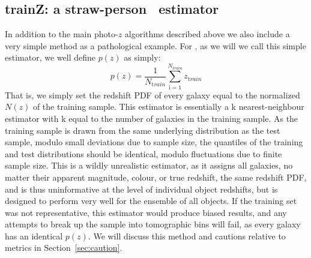 \subsection{trainZ: a straw-person \pz\ estimator}
\label{sec:method:trainz}

In addition to the main photo-$z$ algorithms described above we also include a very simple method as a pathological example.
For \trainz, as we will we call this simple estimator, we well define $p(z)$ as simply:
\begin{equation}
p(z) = \frac{1}{N_{ \mathrm train}}\sum_{\mathrm i=1}^{N_{\mathrm train}}z_{\mathrm train}
\end{equation}
That is, we simply set the redshift PDF of every galaxy equal to the normalized $N(z)$ of the training sample.
This estimator is essentially a k nearest-neighbour estimator with k equal to the number of galaxies in the training sample.
As the training sample is drawn from the same underlying distribution as the test sample, modulo small deviations due to sample size, the quantiles of the training and test distributions should be identical, modulo fluctuations due to finite sample size.
This is a wildly unrealistic estimator, as it assigns all galaxies, no matter their apparent magnitude, colour, or true redshift, the same redshift PDF, and is thus uninformative at the level of individual object redshifts, but is designed to perform very well for the ensemble of all objects.
If the training set was not representative, this estimator would produce biased results, and any attempts to break up the sample into tomographic bins will fail, as every galaxy has an identical $p(z)$.
We will discuss this method and cautions relative to metrics in Section~\ref{sec:caution}.
